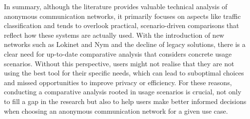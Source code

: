 In summary, although the literature provides valuable technical analysis of anonymous communication networks, it primarily focuses on aspects like traffic classification and tends to overlook practical, scenario-driven comparisons that reflect how these systems are actually used. With the introduction of new networks such as Lokinet and Nym and the decline of legacy solutions, there is a clear need for up-to-date comparative analysis that considers concrete usage scenarios. Without this perspective, users might not realise that they are not using the best tool for their specific needs, which can lead to suboptimal choices and missed opportunities to improve privacy or efficiency. For these reasons, conducting a comparative analysis rooted in usage scenarios is crucial, not only to fill a gap in the research but also to help users make better informed decisions when choosing an anonymous communication network for a given use case.
